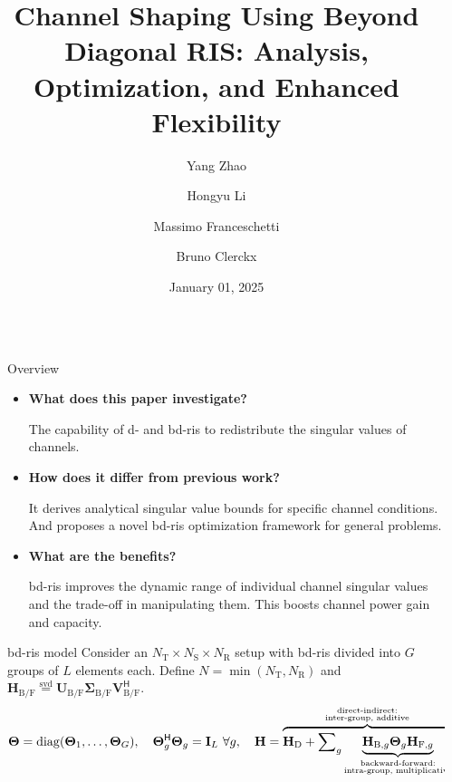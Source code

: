 \documentclass[final,xcolor={table}]{beamer}
\title{Channel Shaping Using Beyond Diagonal RIS: Analysis, Optimization, and Enhanced Flexibility}
\author{Yang Zhao \and Hongyu Li \and Massimo Franceschetti \and Bruno Clerckx}
\date{January 01, 2025}
\DeclareMathOperator{\diag}{diag}
\DeclareMathOperator{\svd}{svd}
\newlength{\sepwidth}
\newlength{\colwidth}
\newcommand{\separatorcolumn}{\begin{column}{\sepwidth}\end{column}}
\begin{document}
\begin{frame}[t]
	\begin{columns}[t]
		\separatorcolumn

		\begin{column}{\colwidth}
			\vspace{-0.5cm}
			\begin{block}{Overview}
				\begin{itemize}\setlength\itemsep{20pt}
					\item \textbf{What does this paper investigate?}

					The capability of \gls{d}- and \gls{bd}-\gls{ris} to redistribute the singular values of \glsfmtshort{mimo} channels.
					\item \textbf{How does it differ from previous work?}

					It derives analytical singular value bounds for specific channel conditions. And proposes a novel \gls{bd}-\gls{ris} optimization framework for general problems.
					\item \textbf{What are the benefits?}

					\gls{bd}-\gls{ris} improves the dynamic range of individual channel singular values and the trade-off in manipulating them. This boosts channel power gain and capacity.
				\end{itemize}
			\end{block}

			\begin{block}{\gls{bd}-\gls{ris} model}
				\setlength{\leftskip}{\leftmargini}
				\setlength{\rightskip}{\leftmargini}
				Consider an $N_\mathrm{T} \times N_\mathrm{S} \times N_\mathrm{R}$ setup with \gls{bd}-\gls{ris} divided into $G$ groups of $L$ elements each.
				Define $N = \min(N_\mathrm{T}, N_\mathrm{R})$ and $\mathbf{H}_{\mathrm{B}/\mathrm{F}}\stackrel{\svd}{=} \mathbf{U}_{\mathrm{B}/\mathrm{F}} \boldsymbol{\Sigma}_{\mathrm{B}/\mathrm{F}} \mathbf{V}_{\mathrm{B}/\mathrm{F}}^\mathsf{H}$.
				\begin{equation*}
					\mathbf{\Theta} = \diag(\mathbf{\Theta}_1,\ldots,\mathbf{\Theta}_G),\quad \mathbf{\Theta}_g^\mathsf{H} \mathbf{\Theta}_g = \mathbf{I}_L \ \forall g, \quad \mathbf{H} = \overbrace{\mathbf{H}_\mathrm{D} + \sum\nolimits_g \underbrace{\mathbf{H}_{\mathrm{B},g} \mathbf{\Theta}_g \mathbf{H}_{\mathrm{F},g}}_{\small{\substack{\text{backward-forward:}\\\text{intra-group, multiplicative}}}}}^{\small{\substack{\text{direct-indirect:}\\\text{inter-group, additive}}}}.
				\end{equation*}


\end{block}
\end{column}
\end{columns}
\end{frame}
\end{document}
